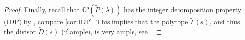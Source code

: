 \documentclass{amsart}
\theoremstyle{definition}
\numberwithin{equation}{section}
\newcommand{\vv}{\upsilon}
\begin{document}
\begin{proof}

Finally, recall that $\mathbb O^{\mathbf s}(\widetilde P(\lambda))$ has the integer decomposition property (IDP) by \cite[Corollary 2.3]{FangFourier}, compare \cref{cor:IDP}. This implies that the polytope $\widetilde\Gamma(s)$, and thus the divisor $\widetilde D(s)$ (if ample), is  very ample, see~\cite[Proposition~2.2.18]{CLS}. 
\end{proof}
\end{document}
